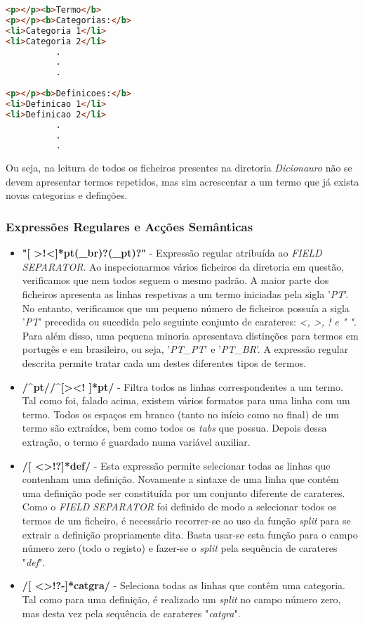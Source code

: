 \documentclass{article}
\begin{document}
\begin{lstlisting}[language=html]
<p></p><b>Termo</b>
<p></p><b>Categorias:</b>
<li>Categoria 1</li>
<li>Categoria 2</li>
          .
          .
          .
        
<p></p><b>Definicoes:</b>
<li>Definicao 1</li>
<li>Definicao 2</li>
          .
          .
          .
\end{lstlisting}


Ou seja, na leitura de todos os ficheiros presentes na diretoria \emph{Dicionauro} não se devem apresentar termos repetidos, mas sim acrescentar a um termo que já exista novas categorias e definções.


\subsubsection{Expressões Regulares e Acções Semânticas}

\begin{itemize}
    \item \textbf{"[ \textgreater!\textless]*pt(\_br)?(\_pt)?"} - Expressão regular atribuída ao \emph{FIELD SEPARATOR}. Ao inspecionarmos vários ficheiros da diretoria em questão, verificamos que nem todos seguem o mesmo padrão. A maior parte dos ficheiros apresenta as linhas respetivas a um termo iniciadas pela sigla '\emph{PT}'. No entanto, verificamos que um pequeno número de ficheiros possuía a sigla '\emph{PT}' precedida ou sucedida pelo seguinte conjunto de carateres: \emph{\textless, \textgreater, ! e " "}. Para além disso, uma pequena minoria apresentava distinções para termos em portugês e em brasileiro, ou seja, '\emph{PT\_PT}' e '\emph{PT\_BR}'. A expressão regular descrita permite tratar cada um destes diferentes tipos de termos. 
    \item \textbf{/\^{}pt/\hspace{0.5em}\textbar\textbar\hspace{0.5em}/\^{}[\textgreater\textless! ]*pt/} - Filtra todos as linhas correspondentes a um termo. Tal como foi, falado acima, existem vários formatos para uma linha com um termo. Todos os espaços em branco (tanto no início como no final) de um termo são extraídos, bem como todos os \emph{tabs} que possua. Depois dessa extração, o termo é guardado numa variável auxiliar.
    \item \textbf{/[ \textless\textgreater!?]*def/} - Esta expressão permite selecionar todas as linhas que contenham uma definição. Novamente a sintaxe de uma linha que contém uma definição pode ser constituída por um conjunto diferente de carateres. Como o \emph{FIELD SEPARATOR} foi definido de modo a selecionar todos os termos de um ficheiro, é necessário recorrer-se ao uso da função \emph{split} para se extrair a definição propriamente dita. Basta usar-se esta função para o campo número zero (todo o registo) e fazer-se o \emph{split} pela sequência de carateres "\emph{def}". 
    \item \textbf{/[ \textless\textgreater!?-]*catgra/} - Seleciona todas as linhas que contêm uma categoria. Tal como para uma definição, é realizado um \emph{split} no campo número zero, mas desta vez pela sequência de carateres "\emph{catgra}".
\end{itemize}
\end{document}
